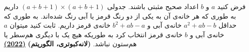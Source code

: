 فرض کنید $a$ و $b$ اعداد صحیح  مثبتی باشند. جدولی  $(a + b + 1) \times (a + b + 1)$ داریم به طوری که هر خانه‌ی آن به یکی از دو رنگ قرمز یا آبی رنگ شده‌اند. به طوری که حداقل $a^2 + ab - b$ خانه‌ی آبی و $b^2 + ab - a$ خانه‌ی قرمز داریم. ثابت کنید میتوان $a$ خانه‌ی آبی و $b$ خانه‌ی قرمز انتخاب کرد به طوریکه هیچ یک با دیگری هم‌سطر یا هم‌ستون نباشد.
\textbf{(لانه‌کبوتری، الگوریتم)}
\href{https://artofproblemsolving.com/community/c5h2808846p24774812}{\textbf{(2022)}}